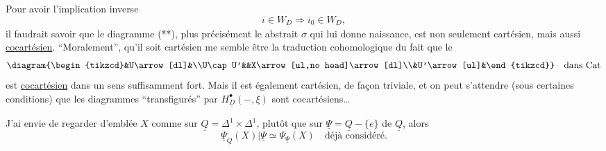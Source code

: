 
Pour avoir l'implication inverse
\[i\in W_{\underline D}\Longrightarrow i_0\in W_{\underline D},\]
il faudrait savoir que le diagramme (**), plus  précisément le   abstrait $\sigma$ qui lui donne naissance, est non seulement cartésien, mais aussi \uline{cocartésien}. ``Moralement'', qu'il soit cartésien me semble être la traduction cohomologique du fait que le 
\[\diagram{\begin{tikzcd}&U\arrow[dl]&\\U\cap U'&&X\arrow[ul,no head]\arrow[dl]\\&U'\arrow[ul]&\end{tikzcd}}\quad\text{dans Cat}\]
est \uline{cocartésien} dans un sens suffisamment fort. Mais il est également cartésien, de façon triviale, et on peut s'attendre (sous certaines conditions) que les diagrammes ``transfigurés'' par $H^\bullet_{\underline D}(-,\xi)$ sont cocartésiens\ldots

J'ai envie de regarder d'emblée $X$ comme sur $\underline Q=\Delta^1\times\Delta^1$, plutôt que sur  $\underline\Psi=\underline Q-\{e\}$ de $\underline Q$, alors
\[\underline\Psi_{\underline Q}(X)|\underline\Psi\simeq\Psi_{\underline\Psi}(X)\quad\text{déjà considéré.}\]

